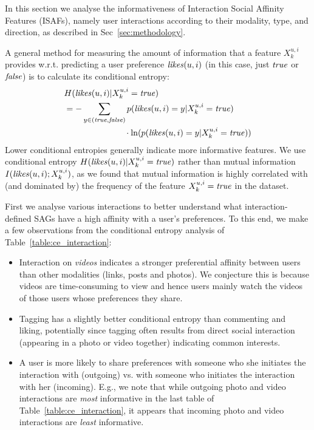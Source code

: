 In this section we analyse the informativeness of Interaction Social
Affinity Features (ISAFs), namely user interactions according to their
modality, type, and direction, as described in
Sec~\ref{sec:methodology}.

A general method for measuring the amount of information that a 
feature $X^{u,i}_k$ provides w.r.t. predicting a user preference $\likes(u,i)$ (in this
case, just $\true$ or $\false$) is to calculate its conditional entropy:
{\small \begin{align*}
&H(\likes(u,i) | X^{u,i}_k=\true)\\
& = -\sum_{y\in{(\true,\false)}} p(\likes(u,i)=y|X^{u,i}_k=\true) \\
& \qquad \qquad \qquad \;\;\;\; \cdot \ln( p(\likes(u,i)=y|X^{u,i}_k=\true))
\end{align*}}
Lower conditional entropies generally indicate more informative
features.  We use conditional entropy $H(\likes(u,i)| X^{u,i}_k=\true)$
rather than mutual information $I(\likes(u,i); X^{u,i}_k)$, as we found 
that mutual information is highly correlated with (and dominated by) the 
frequency of the feature $X^{u,i}_k=\true$ in the dataset.

First we analyse various interactions to better understand what
interaction-defined SAGs have a high affinity with a user's 
preferences.  To this end, we make a few observations from the
conditional entropy analysis of Table~\ref{table:ce_interaction}:
\begin{itemize}
\item Interaction on {\em videos} indicates a stronger preferential
  affinity between users than other modalities (links, posts
  and photos).  We conjecture this is because videos are 
  time-consuming to view and hence users mainly watch the videos of those
  users whose preferences they share.
\item Tagging has a slightly better conditional entropy than
  commenting and liking, potentially since tagging often results from
  direct social interaction (appearing in a photo or video together)
  indicating common interests.
\item A user is more likely to share preferences with someone who she
  initiates the interaction with (outgoing) vs. with someone who
  initiates the interaction with her (incoming).  E.g., we note that
  while outgoing photo and video interactions are \emph{most}
  informative in the last table of Table~\ref{table:ce_interaction},
  it appears that incoming photo and video interactions are
  \emph{least} informative.
\end{itemize}

